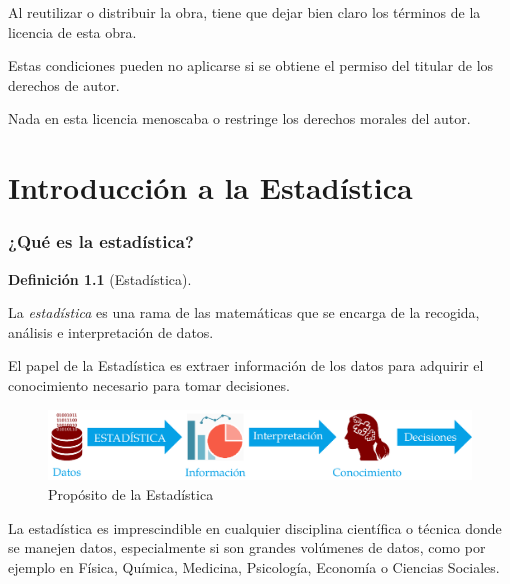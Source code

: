 \documentclass[
  a4paper,
]{scrreport}
\theoremstyle{definition}
\newtheorem{definition}{Definición}[chapter]
\theoremstyle{definition}
\theoremstyle{plain}
\theoremstyle{remark}
\begin{document}
Al reutilizar o distribuir la obra, tiene que dejar bien claro los
términos de la licencia de esta obra.

Estas condiciones pueden no aplicarse si se obtiene el permiso del
titular de los derechos de autor.

Nada en esta licencia menoscaba o restringe los derechos morales del
autor.


\hypertarget{introducciuxf3n-a-la-estaduxedstica}{%
\chapter{Introducción a la
Estadística}\label{introducciuxf3n-a-la-estaduxedstica}}

\hypertarget{quuxe9-es-la-estaduxedstica}{%
\subsection{¿Qué es la estadística?}\label{quuxe9-es-la-estaduxedstica}}

\leavevmode{}%
\begin{definition}[Estadística]\label{def-estadistica}

La \emph{estadística} es una rama de las matemáticas que se encarga de
la recogida, análisis e interpretación de datos.

\end{definition}

El papel de la Estadística es extraer información de los datos para
adquirir el conocimiento necesario para tomar decisiones.

\begin{figure}

{\centering \includegraphics{./img/introduccion/proposito_estadistica.png}

}

\caption{Propósito de la Estadística}

\end{figure}

La estadística es imprescindible en cualquier disciplina científica o
técnica donde se manejen datos, especialmente si son grandes volúmenes
de datos, como por ejemplo en Física, Química, Medicina, Psicología,
Economía o Ciencias Sociales.
\end{document}
